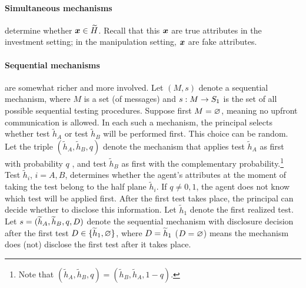 \paragraph{Simultaneous mechanisms} determine whether $\boldsymbol{x}\in \widetilde{H}$.
 Recall that this $\boldsymbol{x}$ are true attributes in the investment  setting; in the manipulation setting, $\boldsymbol{x}$ are fake attributes.

\paragraph{Sequential mechanisms} are somewhat richer and more involved. Let $(M,s)$ denote a sequential mechanism, where $M$ is a set (of messages) and $s: M\rightarrow S_1$ is the set of all possible sequential testing procedures. 
Suppose first $M=\varnothing$, meaning no upfront communication is allowed.
In
each such a mechanism, the principal selects whether test $\widetilde{h}_{A}$
or test $\widetilde{h}_{B}$ will be performed first. This choice can be
random. Let the triple $(\widetilde{h}_{A},\widetilde{h}_{B},q)$ denote the
mechanism that applies test $\widetilde{h}_{A}$ as first with probability $q$%
, and test $\widetilde{h}_{B}$ as first with the complementary probability.\footnote{Note that $(\widetilde{h}_{A},\widetilde{h}_{B},q)=(\widetilde{h}_{B},%
\widetilde{h}_{A},1-q)$.}
 Test $\widetilde{h}_{i}$, $i=A,B$, determines
whether the agent's attributes at the moment of taking the test belong to the
half plane $\widetilde{h}_{i}$. 
If $q\neq 0,1$, the agent does not know which test will be applied first.
After the first test takes place, the principal can decide whether to disclose this information.
Let $\widetilde{h}_{1}$ denote the first realized test.
Let $s= (\widetilde{h}_{A},\widetilde{h}_{B},q,D)$ denote the sequential mechanism with disclosure decision after the first test $D\in \{\widetilde{h}_{1},\varnothing\}$, where
 $D=\widetilde{h}_{1}$ ($D=\varnothing$) means the mechanism does (not) disclose the first test after it takes place. 

